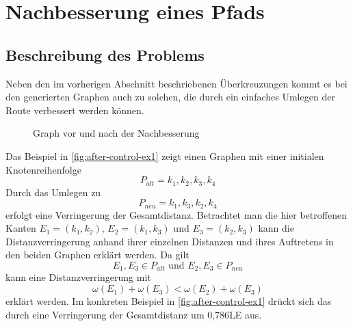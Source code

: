 \section{Nachbesserung eines Pfads}
\label{sec:after-control}
\subsection{Beschreibung des Problems}
Neben den im vorherigen Abschnitt beschriebenen Überkreuzungen kommt es bei den generierten Graphen auch zu solchen, die durch ein einfaches Umlegen der Route verbessert werden können.

\begin{figure}[h]
    \begin{center}
    
    \hfil
    \end{center}
    \caption{Graph vor und nach der Nachbesserung}
    \label{fig:after-control-ex1}
\end{figure}

Das Beispiel in \vref{fig:after-control-ex1} zeigt einen Graphen mit einer initialen Knotenreihenfolge
$$P_{alt} = k_1,k_2,k_3,k_4$$
Durch das Umlegen zu
$$P_{neu} =k_1,k_3,k_2,k_4$$
erfolgt eine Verringerung der Gesamtdistanz.
Betrachtet man die hier betroffenen Kanten $E_1 = (k_1,k_2)$, $ E_2 = (k_1,k_3)$ und $E_3=(k_2,k_3)$ kann die Distanzverringerung anhand ihrer einzelnen Distanzen und ihres Auftretens in den beiden Graphen erklärt werden.
Da gilt 
$$E_1,E_3\in P_{alt} \textrm{ und } E_2,E_3 \in P_{neu}$$
kann eine Distanzverringerung mit
$$\omega(E_1) + \omega(E_3) < \omega(E_2) + \omega(E_3)$$
erklärt werden.
Im konkreten Beispiel in \vref{fig:after-control-ex1} drückt sich das durch eine Verringerung der Gesamtdistanz um 0,786\ac{LE} aus.



